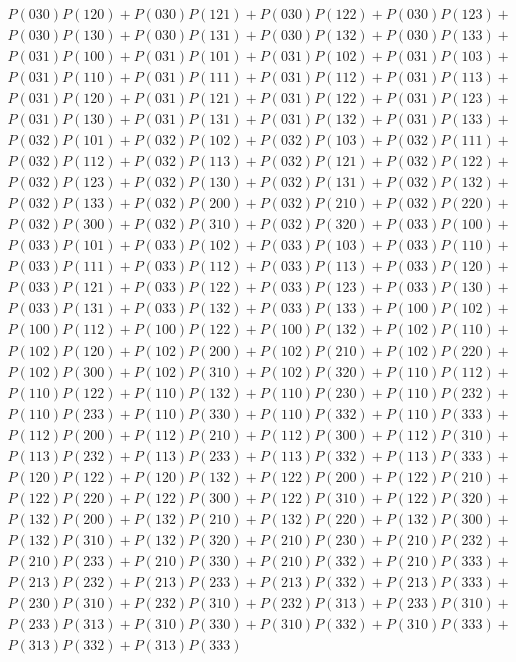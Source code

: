 \documentclass{article}
\theoremstyle{definition}
\begin{document}
\begin{gather*}
    P(030)P(120) + P(030)P(121) + P(030)P(122) + P(030)P(123) + \\
    P(030)P(130) + P(030)P(131) + P(030)P(132) + P(030)P(133) + \\
    P(031)P(100) + P(031)P(101) + P(031)P(102) + P(031)P(103) + \\
    P(031)P(110) + P(031)P(111) + P(031)P(112) + P(031)P(113) + \\
    P(031)P(120) + P(031)P(121) + P(031)P(122) + P(031)P(123) + \\
    P(031)P(130) + P(031)P(131) + P(031)P(132) + P(031)P(133) + \\
    P(032)P(101) + P(032)P(102) + P(032)P(103) + P(032)P(111) + \\
    P(032)P(112) + P(032)P(113) + P(032)P(121) + P(032)P(122) + \\
    P(032)P(123) + P(032)P(130) + P(032)P(131) + P(032)P(132) + \\
    P(032)P(133) + P(032)P(200) + P(032)P(210) + P(032)P(220) + \\
    P(032)P(300) + P(032)P(310) + P(032)P(320) + P(033)P(100) + \\
    P(033)P(101) + P(033)P(102) + P(033)P(103) + P(033)P(110) + \\
    P(033)P(111) + P(033)P(112) + P(033)P(113) + P(033)P(120) + \\
    P(033)P(121) + P(033)P(122) + P(033)P(123) + P(033)P(130) + \\
    P(033)P(131) + P(033)P(132) + P(033)P(133) + P(100)P(102) + \\
    P(100)P(112) + P(100)P(122) + P(100)P(132) + P(102)P(110) + \\
    P(102)P(120) + P(102)P(200) + P(102)P(210) + P(102)P(220) + \\
    P(102)P(300) + P(102)P(310) + P(102)P(320) + P(110)P(112) + \\
    P(110)P(122) + P(110)P(132) + P(110)P(230) + P(110)P(232) + \\
    P(110)P(233) + P(110)P(330) + P(110)P(332) + P(110)P(333) + \\
    P(112)P(200) + P(112)P(210) + P(112)P(300) + P(112)P(310) + \\
    P(113)P(232) + P(113)P(233) + P(113)P(332) + P(113)P(333) + \\
    P(120)P(122) + P(120)P(132) + P(122)P(200) + P(122)P(210) + \\
    P(122)P(220) + P(122)P(300) + P(122)P(310) + P(122)P(320) + \\
    P(132)P(200) + P(132)P(210) + P(132)P(220) + P(132)P(300) + \\
    P(132)P(310) + P(132)P(320) + P(210)P(230) + P(210)P(232) + \\
    P(210)P(233) + P(210)P(330) + P(210)P(332) + P(210)P(333) + \\
    P(213)P(232) + P(213)P(233) + P(213)P(332) + P(213)P(333) + \\
    P(230)P(310) + P(232)P(310) + P(232)P(313) + P(233)P(310) + \\
    P(233)P(313) + P(310)P(330) + P(310)P(332) + P(310)P(333) + \\
    P(313)P(332) + P(313)P(333)
    \end{gather*}
\end{document}
